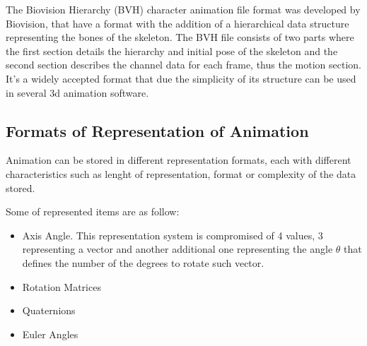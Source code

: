 The Biovision Hierarchy (BVH) character animation file format was developed by Biovision,   
that have a format with the addition of a hierarchical data structure 
representing the bones of the skeleton. The BVH file consists of two parts
where the first section details the hierarchy and initial pose of the skeleton and the second section
describes the channel data for each frame, thus the motion section.
It's a widely accepted format that due the simplicity of its structure can be used in several
3d animation software.

\subsection{Formats of Representation of Animation} \label{subsec:AnimationRepresentationFormats}

Animation can be stored in different representation formats, each with different characteristics such as lenght of representation,  format or complexity of the data stored.

Some of represented items are as follow:

\begin{itemize} 
	\item  Axis Angle.
	This representation system is compromised of 4 values, 3 representing a vector and another additional one representing 
	the angle $\theta$ that defines the number of the degrees to rotate such vector.
	\item  Rotation Matrices
	
	\item  Quaternions
	
	\item  Euler Angles
	
\end{itemize}
